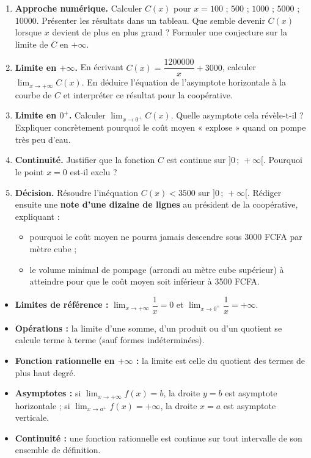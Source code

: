 \documentclass[11pt]{article}
\newcommand{\cle}[1]{{\popxbold\color{popdark}#1}}
\newcounter{popsec}
\newcounter{popsub}
\newcommand{\courssub}[1]{%
  \stepcounter{popsub}%
  \par\vspace{9pt}\noindent{\popxbold\fontsize{11.5}{13}\selectfont\color{popink}{\color{poporange}\thepopsec.\thepopsub}\hspace{6pt}#1}\par\nopagebreak\vspace{4pt}
}
\begin{document}
\begin{enumerate}
\item \textbf{Approche numérique.} Calculer $C(x)$ pour $x = 100$ ; $500$ ; $\num{1000}$ ; $\num{5000}$ ; $\num{10000}$. Présenter les résultats dans un tableau. Que semble devenir $C(x)$ lorsque $x$ devient de plus en plus grand ? Formuler une conjecture sur la limite de $C$ en $+\infty$.
\item \textbf{Limite en $+\infty$.} En écrivant $C(x) = \dfrac{\num{1200000}}{x} + \num{3000}$, calculer $\displaystyle\lim_{x \to +\infty} C(x)$. En déduire l'équation de l'asymptote horizontale à la courbe de $C$ et interpréter ce résultat pour la coopérative.
\item \textbf{Limite en $0^+$.} Calculer $\displaystyle\lim_{x \to 0^+} C(x)$. Quelle asymptote cela révèle-t-il ? Expliquer concrètement pourquoi le coût moyen « explose » quand on pompe très peu d'eau.
\item \textbf{Continuité.} Justifier que la fonction $C$ est continue sur $]0\,;\,+\infty[$. Pourquoi le point $x = 0$ est-il exclu ?
\item \textbf{Décision.} Résoudre l'inéquation $C(x) < \num{3500}$ sur $]0\,;\,+\infty[$. Rédiger ensuite une \textbf{note d'une dizaine de lignes} au président de la coopérative, expliquant :
\begin{itemize}
\item pourquoi le coût moyen ne pourra jamais descendre sous \num{3000} FCFA par mètre cube ;
\item le volume minimal de pompage (arrondi au mètre cube supérieur) à atteindre pour que le coût moyen soit inférieur à \num{3500} FCFA.
\end{itemize}
\end{enumerate}

\courssub{Ressources à mobiliser}

\begin{aretenir}
\begin{itemize}
\item \textbf{Limites de référence :} $\displaystyle\lim_{x \to +\infty} \dfrac{1}{x} = 0$ et $\displaystyle\lim_{x \to 0^+} \dfrac{1}{x} = +\infty$.
\item \textbf{Opérations :} la limite d'une somme, d'un produit ou d'un quotient se calcule terme à terme (sauf formes indéterminées).
\item \textbf{Fonction rationnelle en $+\infty$ :} la limite est celle du quotient des termes de plus haut degré.
\item \textbf{Asymptotes :} si $\displaystyle\lim_{x \to +\infty} f(x) = b$, la droite $y = b$ est \cle{asymptote horizontale} ; si $\displaystyle\lim_{x \to a^+} f(x) = +\infty$, la droite $x = a$ est \cle{asymptote verticale}.
\item \textbf{Continuité :} une fonction rationnelle est continue sur tout intervalle de son ensemble de définition.
\end{itemize}
\end{aretenir}
\end{document}
